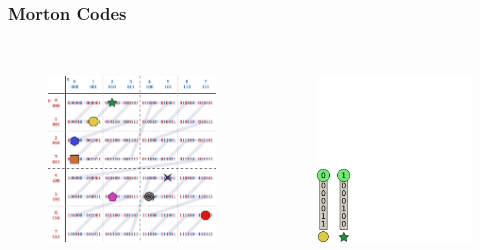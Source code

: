 \documentclass{beamer}
\begin{document}
\begin{frame}
  \frametitle{Morton Codes}
  
\begin{columns}[t]

\begin{figure}
\includegraphics[height=55mm]{Z-curve-primitives.png}
\end{figure}

\begin{figure}
\includegraphics[height=55mm]{keys_1.png}
\end{figure}
\end{columns}
\end{frame}
\end{document}
